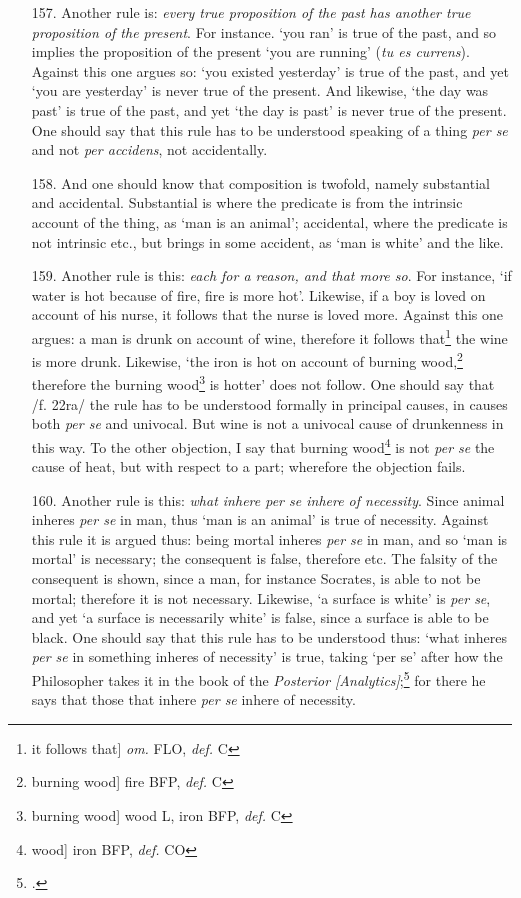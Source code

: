\begin{itemize}
\item[157.] Another rule is: \textit{every true proposition of the past has another true proposition of the present}. For instance. `you ran' is true of the past, and so implies the proposition of the present `you are running' (\textit{tu es currens}). Against this one argues so: `you existed yesterday' is true of the past, and yet `you are yesterday' is never true of the present. And likewise, `the day was past' is true of the past, and yet `the day is past' is never true of the present. One should say that this rule has to be understood speaking of a thing \textit{per se} and not \textit{per accidens}, not accidentally.
\item[158.] And one should know that composition is twofold, namely substantial and accidental. Substantial is where the predicate is from the intrinsic account of the thing, as `man is an animal'; accidental, where the predicate is not intrinsic etc., but brings in some accident, as `man is white' and the like.
\item[159.] Another rule is this: \textit{each for a reason, and that more so}. For instance, `if water is hot because of fire, fire is more hot'. Likewise, if a boy is loved on account of his nurse, it follows that the nurse is loved more. Against this one argues: a man is drunk on account of wine, therefore it follows that\footnote{it follows that] \textit{om.} FLO, \textit{def.} C} the wine is more drunk. Likewise, `the iron is hot on account of burning wood,\footnote{burning wood] fire BFP, \textit{def.} C} therefore the burning wood\footnote{burning wood] wood L, iron BFP, \textit{def.} C} is hotter' does not follow. One should say that /f. 22ra/ the rule has to be understood formally in principal causes, in causes both \textit{per se} and univocal. But wine is not a univocal cause of drunkenness in this way. To the other objection, I say that burning wood\footnote{wood] iron BFP, \textit{def.} CO} is not \textit{per se} the cause of heat, but with respect to a part; wherefore the objection fails.
\item[160.] Another rule is this: \textit{what inhere per se inhere of necessity}. Since animal inheres \textit{per se} in man, thus `man is an animal' is true of necessity. Against this rule it is argued thus: being mortal inheres \textit{per se} in man, and so `man is mortal' is necessary; the consequent is false, therefore etc. The falsity of the consequent is shown, since a man, for instance Socrates, is able to not be mortal; therefore it is not necessary. Likewise, `a surface is white' is \textit{per se}, and yet `a surface is necessarily white' is false, since a surface is able to be black. One should say that this rule has to be understood thus: `what inheres \textit{per se} in something inheres of necessity' is true, taking `per se' after how the Philosopher takes it in the book of the \textit{Posterior [Analytics]};\footnote{\cite[I. 4, p. 73a.35]{Post.An}.} for there he says that those that inhere \textit{per se} inhere of necessity. 


\end{itemize}
